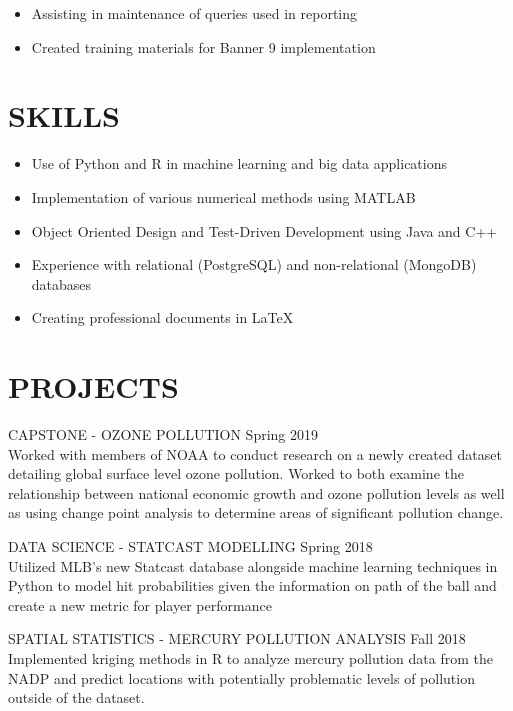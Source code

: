 \documentclass[11pt]{res} %
\begin{document}
\begin{resume}
\begin{itemize} 
	\item Assisting in maintenance of queries used in reporting
	\item Created training materials for Banner 9 implementation
\end{itemize}

\vspace{-0.2in}
\hrulefill
\vspace{-0.2in}  
\section{SKILLS}

\begin{itemize} 
	\item Use of Python and R in machine learning and big data applications
	\item Implementation of various numerical methods using MATLAB
	\item Object Oriented Design and Test-Driven Development using Java and C++
	\item Experience with relational (PostgreSQL) and non-relational (MongoDB) databases
	\item Creating professional documents in \LaTeX
\end{itemize}

\vspace{-0.2in}
\hrulefill
\vspace{-0.2in}  

\section{PROJECTS}
\begin{hangparas}{.25in}{1}
CAPSTONE - OZONE POLLUTION \hfill Spring 2019	\\
Worked with members of NOAA to conduct research on a newly created dataset detailing global surface level ozone pollution. Worked to both examine the relationship between national economic growth and ozone pollution levels as well as using change point analysis to determine areas of significant pollution change.
\vspace{-0.15in}  

DATA SCIENCE - STATCAST MODELLING \hfill Spring 2018 \\ \indent Utilized MLB's new Statcast database alongside machine learning techniques in Python to model hit probabilities given the information on path of the ball and create a new metric for player performance
\vspace{-0.15in}  

SPATIAL STATISTICS - MERCURY POLLUTION ANALYSIS \hfill Fall 2018 \\ \indent Implemented kriging methods in R to analyze mercury pollution data from the NADP and predict locations with potentially problematic levels of pollution outside of the dataset.
\end{hangparas}
\end{resume}
\end{document}
